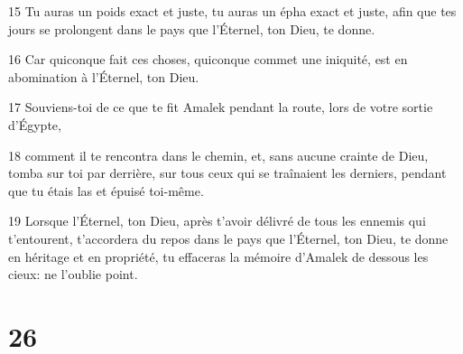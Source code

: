 \par 15 Tu auras un poids exact et juste, tu auras un épha exact et juste, afin que tes jours se prolongent dans le pays que l'Éternel, ton Dieu, te donne.
\par 16 Car quiconque fait ces choses, quiconque commet une iniquité, est en abomination à l'Éternel, ton Dieu.
\par 17 Souviens-toi de ce que te fit Amalek pendant la route, lors de votre sortie d'Égypte,
\par 18 comment il te rencontra dans le chemin, et, sans aucune crainte de Dieu, tomba sur toi par derrière, sur tous ceux qui se traînaient les derniers, pendant que tu étais las et épuisé toi-même.
\par 19 Lorsque l'Éternel, ton Dieu, après t'avoir délivré de tous les ennemis qui t'entourent, t'accordera du repos dans le pays que l'Éternel, ton Dieu, te donne en héritage et en propriété, tu effaceras la mémoire d'Amalek de dessous les cieux: ne l'oublie point.

\chapter{26}

